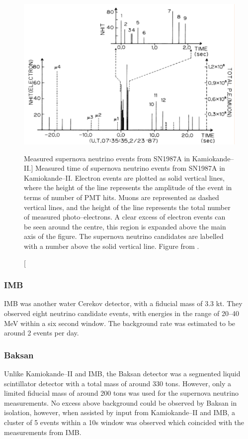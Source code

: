 \begin{figure}
	\centering
	\includegraphics{figures/kami_1987.pdf}
	\caption
	[Measured supernova neutrino events from SN1987A in Kamiokande--II.]
	{Measured time of supernova neutrino events from SN1987A in Kamiokande--II. 
	Electron events are plotted as solid vertical lines, where the height of the 
	line represents the amplitude of the event in terms of number of PMT hits. 
	Muons are represented as dashed vertical lines, and the height of the line 
	represents the total number of measured photo--electrons. A clear excess of 
	electron events can be seen around the centre, this region is expanded above 
	the main axis of the figure. The supernova neutrino candidates are labelled
	with a number above the solid vertical line. Figure from 
	\cite{Hirata:1987hu}.}
	\label{fig:kami_1987}
\end{figure}

\subsubsection{IMB}
IMB was another water Cerekov detector, with a fiducial mass of 3.3 kt. They
observed eight neutrino candidate events, with energies in the range of 20--40
MeV within a six second window. The background rate was estimated to be around 2
events per day\cite{PhysRevLett.58.1494}.

\subsubsection{Baksan}
Unlike Kamiokande--II and IMB, the Baksan detector was a segmented liquid
scintillator detector with a total mass of around 330 tons. However, only a
limited fiducial mass of around 200 tons was used for the supernova neutrino
measurements. No excess above background could be observed by Baksan
in isolation, however, when assisted by input from Kamiokande--II and IMB, a
cluster of 5 events within a 10s window was observed which coincided with the
measurements from IMB\cite{Loredo:2001rx}.

